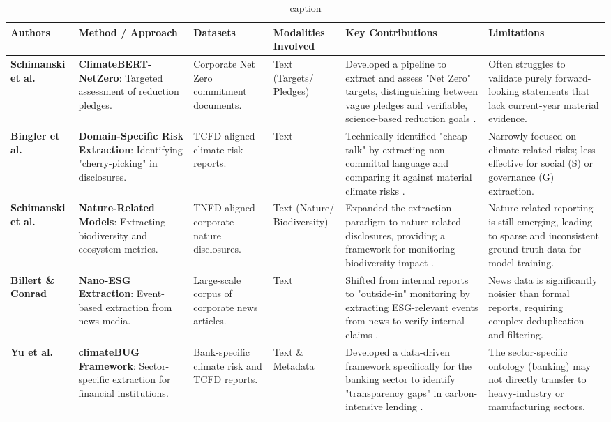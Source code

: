 \begin{landscape}
\begin{table}[p]
\centering
\caption{caption}
\label{label}
\small
\renewcommand{\arraystretch}{1.2}
\begin{tabularx}{\linewidth}{|p{1.8cm}|p{3.5cm}|p{2.5cm}|p{1.8cm}|X|X|}
\hline
Authors & Method / Approach & Datasets & Modalities Involved & Key Contributions & Limitations \\ \hline
\textbf{Schimanski et al.}  \parencite{tobias_schimanski_241ada20} & \textbf{ClimateBERT-NetZero}: Targeted assessment of reduction pledges. & Corporate Net Zero commitment documents. & Text (Targets/ Pledges) & Developed a pipeline to extract and assess "Net Zero" targets, distinguishing between vague pledges and verifiable, science-based reduction goals  \parencite{tobias_schimanski_241ada20}. & Often struggles to validate purely forward-looking statements that lack current-year material evidence. \\ \hline
\textbf{Bingler et al.}  \parencite{julia_bingler_268445e3} & \textbf{Domain-Specific Risk Extraction}: Identifying "cherry-picking" in disclosures. & TCFD-aligned climate risk reports. & Text & Technically identified "cheap talk" by extracting non-committal language and comparing it against material climate risks  \parencite{julia_bingler_268445e3}. & Narrowly focused on climate-related risks; less effective for social (S) or governance (G) extraction. \\ \hline
\textbf{Schimanski et al.}  \parencite{tobias_schimanski_3549ff9f} & \textbf{Nature-Related Models}: Extracting biodiversity and ecosystem metrics. & TNFD-aligned corporate nature disclosures. & Text (Nature/ Biodiversity) & Expanded the extraction paradigm to nature-related disclosures, providing a framework for monitoring biodiversity impact  \parencite{tobias_schimanski_3549ff9f}. & Nature-related reporting is still emerging, leading to sparse and inconsistent ground-truth data for model training. \\ \hline
\textbf{Billert \& Conrad}  \parencite{fabian_billert_a5fbb687} & \textbf{Nano-ESG Extraction}: Event-based extraction from news media. & Large-scale corpus of corporate news articles. & Text & Shifted from internal reports to "outside-in" monitoring by extracting ESG-relevant events from news to verify internal claims  \parencite{fabian_billert_a5fbb687}. & News data is significantly noisier than formal reports, requiring complex deduplication and filtering. \\ \hline
\textbf{Yu et al.}  \parencite{yinan_yu_e282fd98} & \textbf{climateBUG Framework}: Sector-specific extraction for financial institutions. & Bank-specific climate risk and TCFD reports. & Text \& Metadata & Developed a data-driven framework specifically for the banking sector to identify "transparency gaps" in carbon-intensive lending  \parencite{yinan_yu_e282fd98}. & The sector-specific ontology (banking) may not directly transfer to heavy-industry or manufacturing sectors. \\ \hline

\end{tabularx}
\end{table}
\end{landscape}
